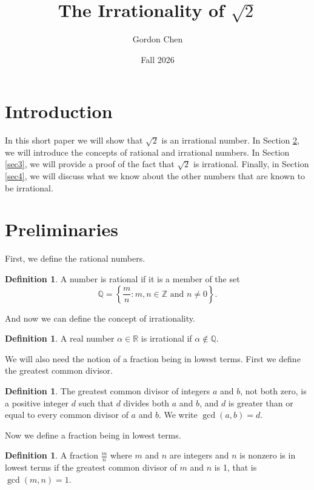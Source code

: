 \documentclass[12pt, letterpaper]{article}
\title{The Irrationality of \(\sqrt{2}\)}
\author{Gordon Chen}
\date{Fall 2026}
\theoremstyle{definition}
\theoremstyle{definition}
\newtheorem{defn}[thm]{Definition}
\begin{document}
\maketitle

\section{Introduction} \label{intro}
In this short paper we will show that \(\sqrt{2}\) is an irrational number.
In Section \ref{sec2}, we will introduce the concepts of rational and irrational numbers.
In Section \ref{sec3}, we will provide a proof of the fact that \(\sqrt{2}\) is irrational.
Finally, in Section \ref{sec4}, we will discuss what we know about the other numbers that are
known to be irrational.


\section{Preliminaries} \label{sec2}
First, we define the rational numbers.

\begin{defn}
    A number is rational if it is a member of the set
    \[ \mathbb{Q} = \left\{\frac{m}{n} : m, n \in \mathbb{Z} \text{ and } n \ne 0 \right\}.\]
\end{defn}

And now we can define the concept of irrationality.
\begin{defn}
    A real number \(\alpha \in \mathbb{R}\) is irrational if \(\alpha \notin \mathbb{Q}\).
\end{defn}

We will also need the notion of a fraction being in lowest terms.
First we define the greatest common divisor.
\begin{defn}
    The greatest common divisor of integers \(a\) and \(b\), not both zero, is a positive integer
    \(d\) such that \(d\) divides both \(a\) and \(b\), and \(d\) is greater than or equal to every
    common divisor of \(a\) and \(b\). We write \(\gcd(a, b) = d\).
\end{defn}

Now we define a fraction being in lowest terms.
\begin{defn}
    A fraction \(\frac{m}{n}\) where \(m\) and \(n\) are integers and \(n\) is nonzero is in lowest
    terms if the greatest common divisor of \(m\) and \(n\) is 1, that is \(\gcd(m, n) = 1\).
\end{defn}
\end{document}
